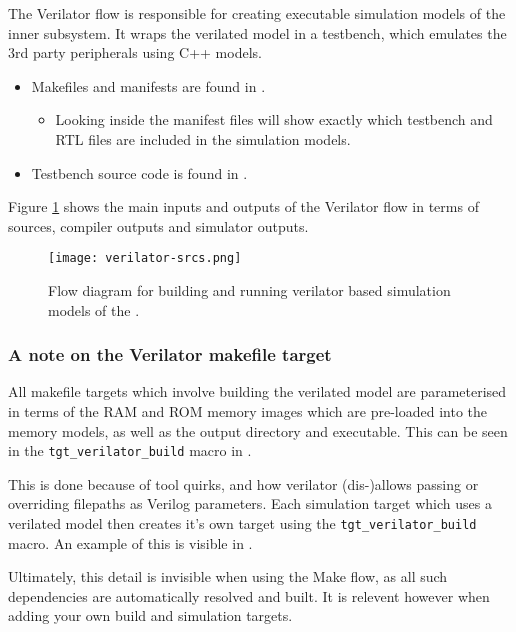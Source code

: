 
The Verilator flow is responsible for creating executable simulation
models of the \SCARVSOC inner subsystem.
It wraps the verilated model in a testbench, which emulates the
3rd party peripherals using C++ models.

\begin{itemize}
\item Makefiles and manifests are found in .
\begin{itemize}
\item Looking inside the manifest files will show exactly which testbench
    and RTL files are included in the simulation models.
\end{itemize}
\item Testbench source code is found in .
\end{itemize}

Figure \ref{fig:flow:verilator:artifacts}
shows the main inputs and outputs of the Verilator flow in terms
of sources, compiler outputs and simulator outputs.

\begin{figure}
\centering
\texttt{[image: verilator-srcs.png]}
\caption{
    Flow diagram for building and running verilator based simulation
    models of the \SCARVSOC.
}
\label{fig:flow:verilator:artifacts}
\end{figure}


\subsubsection{A note on the Verilator makefile target}

All makefile targets which involve building the verilated model
are parameterised in terms of the RAM and ROM memory images which
are pre-loaded into the memory models, as well as the
output directory and executable.
This can be seen in the {\tt tgt\_verilator\_build} macro in
.

This is done because of tool quirks, and how verilator (dis-)allows
passing or overriding filepaths as Verilog parameters.
Each simulation target which uses a verilated model then creates
it's own target using the {\tt tgt\_verilator\_build} macro.
An example of this is visible in .

Ultimately, this detail is invisible when using the Make flow, as all
such dependencies are automatically resolved and built.
It is relevent however when adding your own build and simulation targets.


